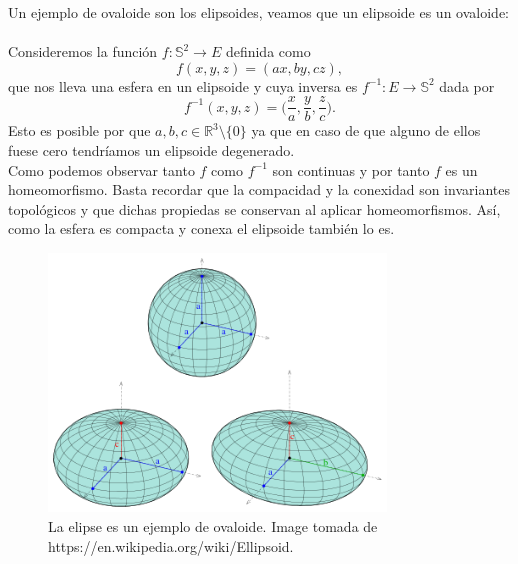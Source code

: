 \begin{ejemplo} 
	
	Un ejemplo de ovaloide son los elipsoides, veamos que un elipsoide es un ovaloide:
${ }$\\

	Consideremos la función $f : \mathbb{S}^2 \to E$ definida como
	\[
		f(x,y,z) = (ax,by,cz),
	\]
	que nos lleva una esfera en un elipsoide y cuya inversa es $f^{-1} : E \to \mathbb{S}^2$ dada por
	\[
		f^{-1} (x,y,z) = \Big(\frac x a, \frac y b, \frac z c \Big).
	\]
	Esto es posible por que $a,b,c \in \mathbb{R}^3 \setminus \{0\}$ ya que en caso de que alguno de ellos fuese cero tendríamos un elipsoide degenerado.
	${ }$\\
	
	Como podemos observar tanto $f$ como $f^{-1}$ son continuas y por tanto $f$ es un homeomorfismo. Basta recordar que la compacidad y la conexidad son invariantes topológicos y que dichas propiedas se conservan al aplicar homeomorfismos. Así, como la esfera es compacta y conexa el elipsoide también lo es.
	
	
	
		\begin{figure}[h]
			\begin{center}
				\includegraphics[width=0.8\textwidth]{imagenes/ellipsoid.png}
			\end{center}
			\caption{La elipse es un ejemplo de ovaloide. Image tomada de https://en.wikipedia.org/wiki/Ellipsoid.}
			\label{fig:etiq_3}
		\end{figure}
		

\end{ejemplo}
